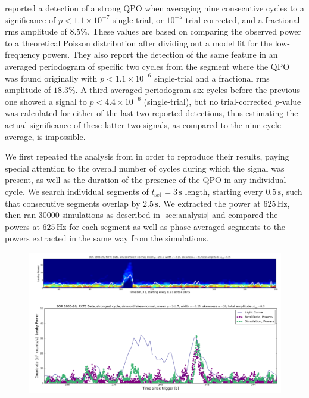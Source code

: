 \documentclass{emulateapj}
\begin{document}
%
%

\citealt{Strohmayer06} reported a detection of a strong QPO when averaging nine consecutive cycles to a significance of $p < 1.1 \times 10^{-7}$ single-trial, or $10^{-5}$ trial-corrected, and a fractional rms amplitude of $8.5\%$. These values are based on comparing the observed power to a theoretical Poisson distribution after dividing out a model fit for the low-frequency powers. They also report the detection of the same feature in an averaged periodogram of specific two cycles from the segment where the QPO was found originally with $p < 1.1 \times 10^{-6}$ single-trial and a fractional rms amplitude of $18.3\%$. A third averaged periodogram six cycles before the previous one showed a signal to $p < 4.4 \times 10^{-6}$ (single-trial), but no trial-corrected $p$-value was calculated for either of the last two reported detections, thus estimating the actual significance of these latter two signals, as compared to the nine-cycle average, is impossible.

We first repeated the analysis from \citealt{Strohmayer06} in order to reproduce their results, paying special attention to the overall number of cycles during which the signal was present, as well as the duration of the presence of the QPO in any individual cycle.
We search individual segments of $t_{\mathrm{set}} = 3 \, \mathrm{s}$ length, starting every $0.5 \, \mathrm{s}$, such that consecutive segments overlap by $2.5 \, \mathrm{s}$. We extracted the power at $625 \, \mathrm{Hz}$, then ran 30000 simulations as described in \ref{sec:analysis} and compared the powers at $625 \, \mathrm{Hz}$ for each segment as well as phase-averaged segments to the powers extracted in the same way from the simulations.

\begin{figure}[htbp]
\begin{center}
\includegraphics[width=\textwidth]{1806_rxte_lc_combined.png}
\caption{}
\label{fig:rxte_lc_combined}
\end{center}
\end{figure}
\end{document}
